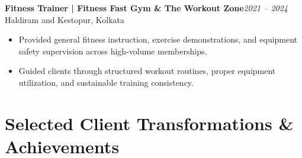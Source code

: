\documentclass[10pt,a4paper]{article}
\newcommand{\job}[3]{%
  \textbf{#1}\hfill{\small\textit{#2}}\\[-1pt]
  {\small\color{softgray}#3}\par\vspace{-2pt}
}
\begin{document}
\job{Fitness Trainer | Fitness Fast Gym \& The Workout Zone}{2021 -- 2024}{Haldiram and Kestopur, Kolkata}

\begin{itemize}
    \item Provided general fitness instruction, exercise demonstrations, and equipment safety supervision across high-volume memberships.
    \item Guided clients through structured workout routines, proper equipment utilization, and sustainable training consistency.
\end{itemize}

\section{Selected Client Transformations \& Achievements}
\end{document}
